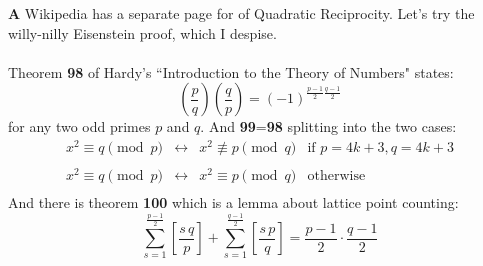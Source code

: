 \documentclass[12pt]{article}
\begin{document}
\noindent \textbf{A} Wikipedia has a separate page for  of Quadratic Reciprocity.  Let's try the willy-nilly Eisenstein proof, which I despise. \\ \\
Theorem {\color{orange!75!green}\textbf{98}} of Hardy's ``Introduction to the Theory of Numbers" states:
$$ \left(\frac{p}{q}\right) \left(\frac{q}{p}\right) = (-1)^{\frac{p-1}{2} \frac{q-1}{2}} $$
for any two odd primes $p$ and $q$. And {\color{orange!75!green}\textbf{99}}={\color{orange!75!green!50!white}\textbf{98}} splitting into the two cases:
$$\begin{array}{cccl}
x^2  \equiv q \pmod p & \leftrightarrow  & x^2  \not \equiv  p \pmod q &
\text{if }  p = 4k+3, q = 4k+3 \\ \\
x^2  \equiv q \pmod p & \leftrightarrow  & x^2  \equiv  p \pmod q &  
\text{otherwise}  \\
\end{array}$$
And there is theorem {\color{orange!75!green}\textbf{100}} which is a lemma about lattice point counting:
$$ \sum_{s = 1}^{\frac{p-1}{2}}  \left[ \frac{s\,q}{p} \right]
+ \sum_{s = 1}^{\frac{q-1}{2}}  \left[ \frac{s\,p}{q} \right] = \frac{p-1}{2} \cdot \frac{q-1}{2}$$
\end{document}
